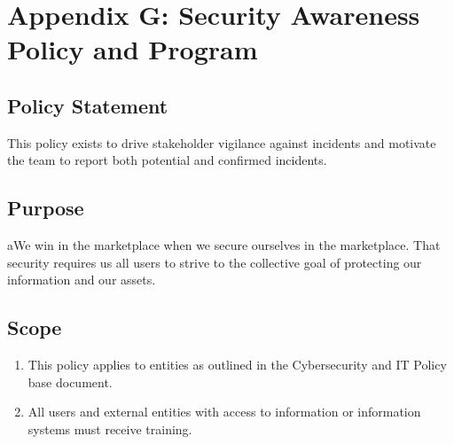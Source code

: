 \documentclass[../main.tex]{subfiles}
\begin{document}
\section{Appendix G: Security Awareness Policy and Program}
\subsection{Policy Statement}
This policy exists to drive stakeholder vigilance against incidents and motivate the team to report both potential and confirmed incidents.
\subsection{Purpose}
aWe win in the marketplace when we secure ourselves in the marketplace. That security requires us all users to strive to the collective goal of protecting our information and our assets.
\subsection{Scope}
\begin{enumerate}
    \item This policy applies to entities as outlined in the Cybersecurity and IT Policy base document.
    \item All \CompanyName{} users and external entities with access to \CompanyName{} information or information systems must receive training.
\end{enumerate}
\end{document}
